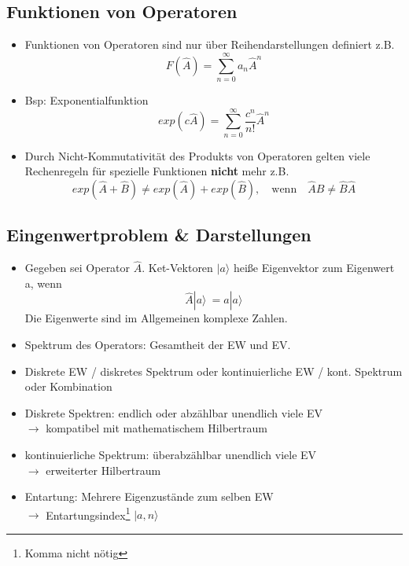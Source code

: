\documentclass[10pt,article,colorback,accentcolor=tud9d]{scrartcl}
\begin{document}
\begin{fleqn}
\subsection{Funktionen von Operatoren}
\begin{itemize}
  \item Funktionen von Operatoren sind nur über Reihendarstellungen definiert z.B.
    \begin{equation}
    F(\hat{A})=\sum^\infty_{n=0}a_n\hat{A}^n
    \end{equation}
  \item Bsp: Exponentialfunktion
    \begin{equation}
    exp(c\hat{A})= \sum^\infty_{n=0}\frac{c^n}{n!}\hat{A}^n
    \end{equation}
  \item Durch Nicht-Kommutativität des Produkts von Operatoren gelten viele Rechenregeln für spezielle Funktionen \textbf{nicht} mehr z.B.
  \begin{equation}
  exp(\hat{A}+\hat{B})\neq exp(\hat{A}) +exp(\hat{B}), \quad \text{wenn} \quad \hat{A}\hat{B} \neq \hat{B}\hat{A}
  \end{equation}
\end{itemize}
\subsection{Eingenwertproblem \& Darstellungen}
\begin{itemize}
  \item Gegeben sei Operator $\hat{A}$. Ket-Vektoren $\left.\right|a\rangle $ heiße Eigenvektor zum Eigenwert a, wenn
    \begin{equation}
    \hat{A}\left.\right|a\rangle  \ = a\left.\right|a\rangle 
    \end{equation}
    \textcolor[rgb]{1,0,0}{Die Eigenwerte sind im Allgemeinen komplexe Zahlen.}
  \item Spektrum des Operators: Gesamtheit der EW und EV.
  \item Diskrete EW / diskretes Spektrum oder kontinuierliche EW / kont. Spektrum oder Kombination
  \item Diskrete Spektren: endlich oder abzählbar unendlich viele EV\\
    $\rightarrow$ kompatibel mit mathematischem Hilbertraum
  \item kontinuierliche Spektrum: überabzählbar unendlich viele EV\\
    $\rightarrow$ erweiterter Hilbertraum
  \item Entartung: Mehrere Eigenzustände zum selben EW\\
    $\rightarrow$ Entartungsindex\footnote{Komma nicht nötig} $\left.\right|a,n\rangle $
\end{itemize}

\end{fleqn}
\end{document}
